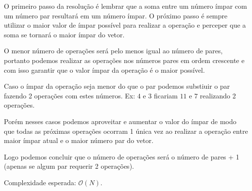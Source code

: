 O primeiro passo da resolução é lembrar que a soma entre um número ímpar com um número par resultará em um número ímpar. O próximo passo é sempre utilizar o maior valor de ímpar possível para realizar a operação e perceper que a soma se tornará o maior ímpar do vetor.

O menor número de operações será pelo menos igual ao número de pares, portanto podemos realizar as operações nos números pares em ordem crescente e com isso garantir que o valor ímpar da operação é o maior possível.

Caso o ímpar da operação seja menor do que o par podemos substiuir o par fazendo 2 operações com estes números. Ex: $4$ e $3$ ficariam $11$ e $7$ realizando 2 operações.

Porém nesses casos podemos aproveitar e aumentar o valor do ímpar de modo que todas as próximas operações ocorram 1 única vez ao realizar a operação entre maior ímpar atual e o maior número par do vetor.

Logo podemos concluir que o número de operações será o número de pares + 1 (apenas se algum par requerir 2 operações).

Complexidade esperada: $\mathcal{O}(N)$.
